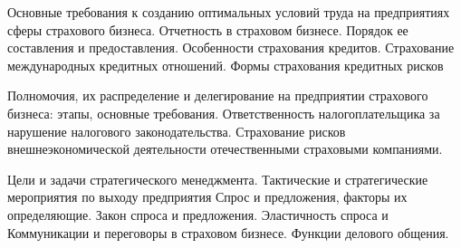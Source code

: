 \documentclass[
	11pt,
	a4paper,
	]
	{article}
\begin{document}
\bigskip

\noindent{} 
	{
		Основные требования к созданию оптимальных условий труда на предприятиях сферы страхового бизнеса.
	}{
		Отчетность в страховом бизнесе. Порядок ее составления и предоставления.
	}{
		Особенности страхования кредитов. Страхование международных кредитных отношений. Формы страхования кредитных рисков
	}

\bigskip

\noindent{} 
	{
		Полномочия, их распределение и делегирование на предприятии страхового бизнеса: этапы, основные требования.
	}{
		Ответственность налогоплательщика за нарушение налогового законодательства.
	}{
		Страхование рисков внешнеэкономической деятельности отечественными страховыми компаниями.
	}

\bigskip

\noindent{} 
	{
		Цели и задачи стратегического менеджмента. Тактические и стратегические мероприятия по выходу предприятия
	}{
		Спрос и предложения, факторы их определяющие. Закон спроса и предложения. Эластичность спроса и
	}{
		Коммуникации и переговоры в страховом бизнесе. Функции делового общения.
	}

\bigskip
\end{document}
